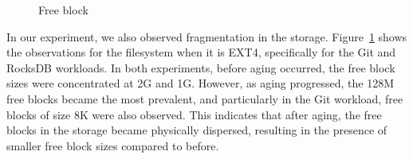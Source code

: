\begin{figure}[t]
    \centering
	\caption{Free block}\label{g:free_block}
\end{figure}

In our experiment, we also observed fragmentation in the storage.
Figure~\ref{g:free_block} shows the observations  for the filesystem when it is EXT4, specifically for the Git and RocksDB workloads.
In both experiments, before aging occurred, the free block sizes were concentrated at 2G and 1G.
However, as aging progressed, the 128M free blocks became the most prevalent, and particularly in the Git workload, free blocks of size 8K were also observed.
This indicates that after aging, the free blocks in the storage became physically dispersed, resulting in the presence of smaller free block sizes compared to before.


